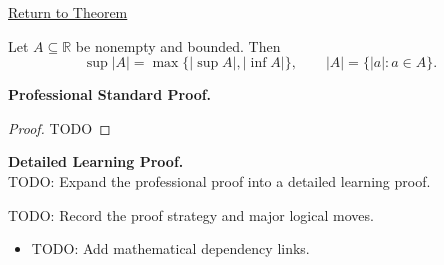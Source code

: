 \newpage
{}
\label{prf:supremum-absolute-value-image}

\begin{remark*}[Return]
\hyperref[thm:supremum-absolute-value-image]{Return to Theorem}
\end{remark*}

\begin{theorem*}
Let $A\subseteq\mathbb{R}$ be nonempty and bounded. Then
\[
  \sup |A|=\max\{|\sup A|,|\inf A|\},
  \qquad
  |A|=\{|a|:a\in A\}.
\]
\end{theorem*}

\textbf{Professional Standard Proof.}~\\
\begin{proof}
TODO
\end{proof}

\textbf{Detailed Learning Proof.}~\\
TODO: Expand the professional proof into a detailed learning proof.

\begin{remark*}
TODO: Record the proof strategy and major logical moves.
\end{remark*}

\begin{dependencies}
\begin{itemize}
  \item TODO: Add mathematical dependency links.
\end{itemize}
\end{dependencies}
